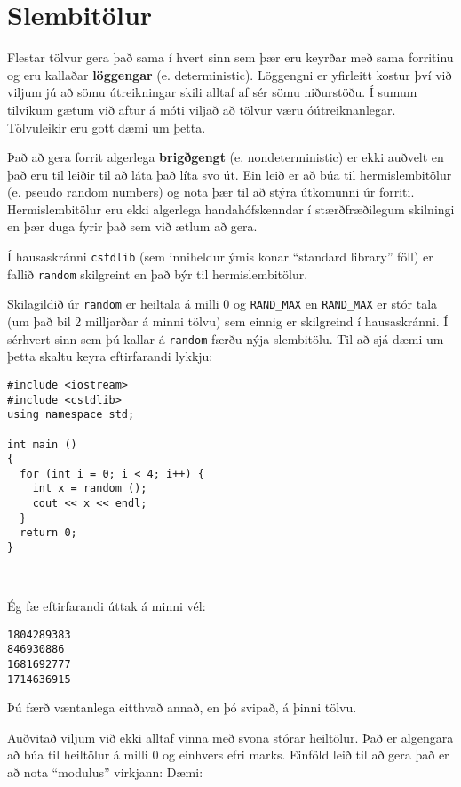 \section{Slembitölur}
\label{random}
\label{pseudorandom}

Flestar tölvur gera það sama í hvert sinn sem þær eru keyrðar með sama forritinu og eru kallaðar {\bf löggengar} (e. deterministic). 
Löggengni er yfirleitt kostur því við viljum jú að sömu útreikningar skili alltaf af sér sömu niðurstöðu.
Í sumum tilvikum gætum við aftur á móti viljað að tölvur væru óútreiknanlegar.  Tölvuleikir eru gott dæmi um þetta.

Það að gera forrit algerlega {\bf brigðgengt} (e. nondeterministic) er ekki auðvelt en það eru til leiðir til að láta það líta svo út.
Ein leið er að búa til hermislembitölur (e. pseudo random numbers) og nota þær til að stýra útkomunni úr forriti.
Hermislembitölur eru ekki algerlega handahófskenndar í stærðfræðilegum skilningi en þær duga fyrir það sem við ætlum að gera.

Í hausaskránni {\tt cstdlib} (sem inniheldur ýmis konar ``standard library'' föll) er fallið {\tt random} skilgreint en það býr til hermislembitölur.

Skilagildið úr {\tt random} er heiltala á milli 0 og {\tt RAND\_MAX}
en {\tt RAND\_MAX} er stór tala (um það bil 2 milljarðar á minni tölvu) sem einnig er skilgreind í hausaskránni.
Í sérhvert sinn sem þú kallar á {\tt random} færðu nýja slembitölu.
Til að sjá dæmi um þetta skaltu keyra eftirfarandi lykkju:

\begin{verbatim}
#include <iostream>
#include <cstdlib>
using namespace std;

int main ()
{
  for (int i = 0; i < 4; i++) {
    int x = random ();
    cout << x << endl;
  }
  return 0;
}

  
\end{verbatim}
%
Ég fæ eftirfarandi úttak á minni vél: 

\begin{verbatim}
1804289383
846930886
1681692777
1714636915
\end{verbatim}
%
Þú færð væntanlega eitthvað annað, en þó svipað, á þinni tölvu.

Auðvitað viljum við ekki alltaf vinna með svona stórar heiltölur.
Það er algengara að búa til heiltölur á milli 0 og einhvers efri marks.
Einföld leið til að gera það er að nota ``modulus'' virkjann:
Dæmi:

